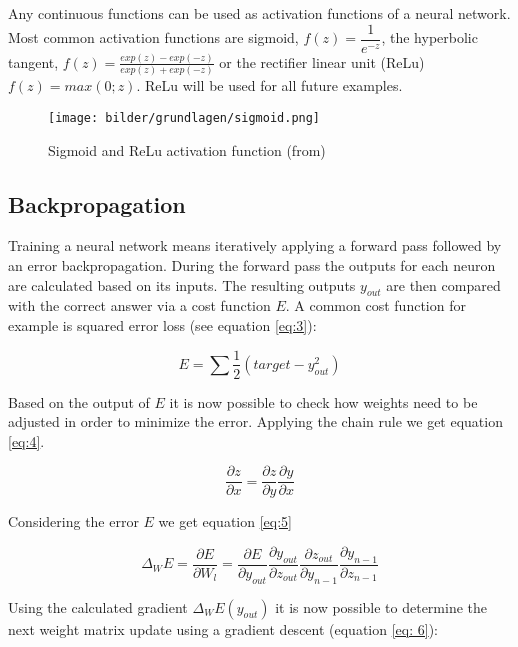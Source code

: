  Any continuous functions can be used as activation functions of a neural network. 
 Most common activation functions are sigmoid,  \(f(z) = \dfrac{1}{e^{-z}}\), 
 the hyperbolic tangent, \(f(z) = \frac{exp(z)-exp(-z)}{exp(z)+exp(-z)}\) or the 
 rectifier linear unit (ReLu) \(f(z) = max(0; z)\). ReLu will be used for all future examples.


\begin{figure}[H]
	\centering
	\texttt{[image: bilder/grundlagen/sigmoid.png]}
	\caption{Sigmoid and ReLu activation function (from\cite{Sigmoid})}
	\label{fig:Sigmoid}
\end{figure}


\subsection{Backpropagation}

Training a neural network means iteratively applying a forward pass followed by an error backpropagation.
During the forward pass the outputs for each neuron are calculated based on its inputs.
The resulting outputs \(y_{out}\) are then compared with the correct answer via a cost function  \(E\).
A common cost function for example is squared error loss (see equation \ref{eq:3}):
 
\begin{equation} \label{eq:3}
	E=\sum\dfrac{1}{2} (target-y_{out}^2) 
\end{equation}

Based on the output of \(E\) it is now possible to check how weights need to be 
adjusted in order to minimize the error.
Applying the chain rule we get equation \ref{eq:4}. 

\begin{equation} \label{eq:4}
	\frac{\partial z}{\partial x} = \frac{\partial z}{\partial y} \frac{\partial y}{\partial x}
\end{equation}

Considering the error  \(E\) we get equation \ref{eq:5}

\begin{equation}  \label{eq:5}
\Delta_{W}E =
\frac{\partial E}{\partial W_{l}} =
\frac{\partial E}{\partial y_{out}}
\frac{\partial y_{out}}{\partial z_{out}}
\frac{\partial z_{out}}{\partial y_{n-1}}
\frac{\partial y_{n-1}}{\partial z_{n-1}}
\end{equation}

Using the calculated gradient $\Delta_{W}E(y_{out})$  it is now possible 
to determine the next weight matrix update using a gradient descent (equation \ref{eq: 6}):

